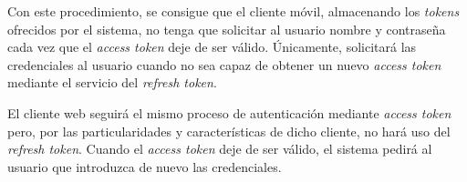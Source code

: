 Con este procedimiento, se consigue que el cliente móvil, almacenando los \textit{tokens} ofrecidos por el sistema, no tenga que solicitar al usuario nombre y contraseña cada vez que el \textit{access token} deje de ser válido. Únicamente, solicitará las credenciales al usuario cuando no sea capaz de obtener un nuevo \textit{access token} mediante el servicio del \textit{refresh token}.

El cliente web seguirá el mismo proceso de autenticación mediante \textit{access token} pero, por las particularidades y características de dicho cliente, no hará uso del \textit{refresh token}. Cuando el \textit{access token} deje de ser válido, el sistema pedirá al usuario que introduzca de nuevo las credenciales.





